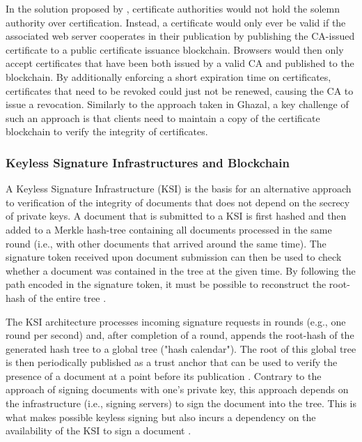 In the solution proposed by \citeauthor{zohar_blockchain-based_2019}, certificate authorities would not hold the solemn authority over certification. Instead, a certificate would only ever be valid if the associated web server cooperates in their publication by publishing the CA-issued certificate to a public certificate issuance blockchain. Browsers would then only accept certificates that have been both issued by a valid CA and published to the blockchain. By additionally enforcing a short expiration time on certificates, certificates that need to be revoked could just not be renewed, causing the CA to issue a revocation. Similarly to the approach taken in Ghazal, a key challenge of such an approach is that clients need to maintain a copy of the certificate blockchain to verify the integrity of certificates.


\subsubsection{Keyless Signature Infrastructures and Blockchain}

A Keyless Signature Infrastructure (KSI) is the basis for an alternative approach to verification of the integrity of documents that does not depend on the secrecy of private keys. A document that is submitted to a KSI is first hashed and then added to a Merkle hash-tree containing all documents processed in the same round (i.e., with other documents that arrived around the same time). The signature token received upon document submission can then be used to check whether a document was contained in the tree at the given time. By following the path encoded in the signature token, it must be possible to reconstruct the root-hash of the entire tree \cite{hutchison_keyless_2013, jamthagen_blockchain-based_2016}.

The KSI architecture processes incoming signature requests in rounds (e.g., one round per second) and, after completion of a round, appends the root-hash of the generated hash tree to a global tree ("hash calendar"). The root of this global tree is then periodically published as a trust anchor that can be used to verify the presence of a document at a point before its publication \cite{hutchison_keyless_2013}. Contrary to the approach of signing documents with one's private key, this approach depends on the infrastructure (i.e., signing servers) to sign the document into the tree. This is what makes possible keyless signing but also incurs a dependency on the availability of the KSI to sign a document \cite{jamthagen_blockchain-based_2016}.

